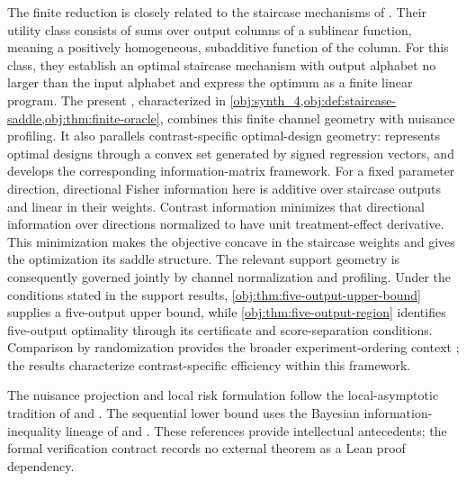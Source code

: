 \documentclass[11pt]{article}
\begin{document}
The finite reduction is closely related to the staircase mechanisms of \citet[Theorems 2 and 4]{KairouzOhViswanath2016}. Their utility class consists of sums over output columns of a sublinear function, meaning a positively homogeneous, subadditive function of the column. For this class, they establish an optimal staircase mechanism with output alphabet no larger than the input alphabet and express the optimum as a finite linear program. %
The present , characterized in \cref{obj:synth_4,obj:def:staircase-saddle,obj:thm:finite-oracle}, combines this finite channel geometry with nuisance profiling. It also parallels contrast-specific optimal-design geometry: \citet[Sections 2--4]{Elfving1952} represents optimal designs through a convex set generated by signed regression vectors, and \citet[Chapter 2]{Pukelsheim2006} develops the corresponding information-matrix framework. For a fixed parameter direction, directional Fisher information here is additive over staircase outputs and linear in their weights. Contrast information minimizes that directional information over directions normalized to have unit treatment-effect derivative. This minimization makes the objective concave in the staircase weights and gives the optimization its saddle structure. The relevant support geometry is consequently governed jointly by channel normalization and profiling. Under the conditions stated in the support results, \cref{obj:thm:five-output-upper-bound} supplies a five-output upper bound, while \cref{obj:thm:five-output-region} identifies five-output optimality through its certificate and score-separation conditions. Comparison by randomization provides the broader experiment-ordering context \citep[pp. 265--272]{Blackwell1953}; the results characterize contrast-specific efficiency within this framework.

The nuisance projection and local risk formulation follow the local-asymptotic tradition of \citet[Chapter 6]{LeCam2000} and \citet[Chapters 7--8 and 25]{VanDerVaart1998}. The sequential lower bound uses the Bayesian information-inequality lineage of \citet{VanTrees2001} and \citet[pp. 59--79]{Gill1995}. These references provide intellectual antecedents; the formal verification contract records no external theorem as a Lean proof dependency.
\end{document}
